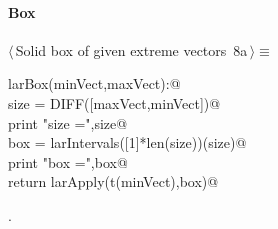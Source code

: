 \documentclass[11pt,oneside]{article}	%
\begin{document}
\paragraph{Box}
\begin{flushleft} \small \label{scrap13}
\protect{}$\langle\,$Solid box of given extreme vectors\nobreak\ {\footnotesize 8a}$\,\rangle\equiv$
\vspace{-1ex}
\begin{list}{}{} \item
\mbox{}\verb@def larBox(minVect,maxVect):@\\
\mbox{}\verb@   size = DIFF([maxVect,minVect])@\\
\mbox{}\verb@   print "size =",size@\\
\mbox{}\verb@   box = larIntervals([1]*len(size))(size)@\\
\mbox{}\verb@   print "box =",box@\\
\mbox{}\verb@   return larApply(t(minVect),box)@\\
\mbox{}\verb@@{\NWsep}
\end{list}
\vspace{-1ex}
\footnotesize\addtolength{\baselineskip}{-1ex}
\begin{list}{}{\setlength{\itemsep}{-\parsep}\setlength{\itemindent}{-\leftmargin}}
\item {\NWtxtMacroNoRef}.
\end{list}
\end{flushleft}
\end{document}
